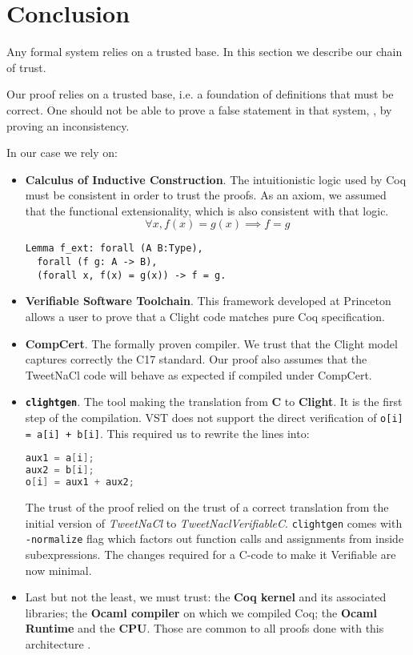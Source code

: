 \section{Conclusion}
\label{sec:Conclusion}

Any formal system relies on a trusted base. In this section we describe our
chain of trust.

Our proof relies on a trusted base, i.e. a foundation of definitions that must be
correct. One should not be able to prove a false statement in that system, \eg, by
proving an inconsistency.

In our case we rely on:
\begin{itemize}
  \item \textbf{Calculus of Inductive Construction}. The intuitionistic logic
  used by Coq must be consistent in order to trust the proofs. As an axiom,
  we assumed that the functional extensionality, which is also consistent with that logic.
  $$\forall x, f(x) = g(x) \implies f = g$$
\begin{lstlisting}[language=Coq]
Lemma f_ext: forall (A B:Type),
  forall (f g: A -> B),
  (forall x, f(x) = g(x)) -> f = g.
\end{lstlisting}

  \item \textbf{Verifiable Software Toolchain}. This framework developed at
  Princeton allows a user to prove that a Clight code matches pure Coq
  specification.

  \item \textbf{CompCert}. The formally proven compiler. We trust that the Clight
  model captures correctly the C17 standard.
  Our proof also assumes that the TweetNaCl code will behave as expected if
  compiled under CompCert.

  \item \textbf{\texttt{clightgen}}. The tool making the translation from \textbf{C} to
  \textbf{Clight}. It is the first step of the compilation.
  VST does not support the direct verification of \texttt{o[i] = a[i] + b[i]}.
  This required us to rewrite the lines into:
\begin{lstlisting}[language=C]
aux1 = a[i];
aux2 = b[i];
o[i] = aux1 + aux2;
\end{lstlisting}
  The trust of the proof relied on the trust of a correct translation from the
  initial version of \emph{TweetNaCl} to \emph{TweetNaclVerifiableC}.
  \texttt{clightgen} comes with \texttt{-normalize} flag which
  factors out function calls and assignments from inside subexpressions.
  The changes required for a C-code to make it Verifiable are now minimal.

  \item Last but not the least, we must trust: the \textbf{Coq kernel} and its
  associated libraries; the \textbf{Ocaml compiler} on which we compiled Coq;
  the \textbf{Ocaml Runtime} and the \textbf{CPU}. Those are common to all proofs
  done with this architecture \cite{2015-Appel,coq-faq}.
\end{itemize}

